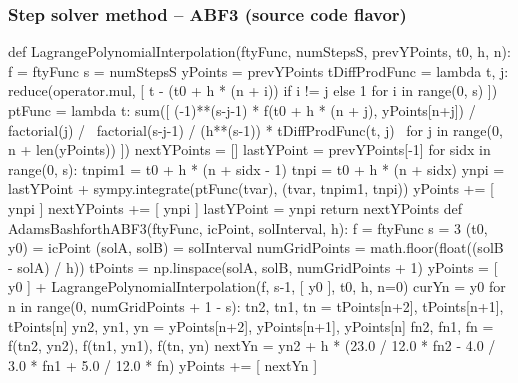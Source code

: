 \documentclass[usenames,svgnames,dvipsnames,10pt]{beamer}
\begin{document}
\begin{frame}[fragile]
\frametitle{Step solver method -- ABF3 (source code flavor)}

\begin{center}
\begin{pythoncodesmall}
def LagrangePolynomialInterpolation(ftyFunc, numStepsS, prevYPoints, t0, h, n):
    f             = ftyFunc
    s             = numStepsS 
    yPoints       = prevYPoints
    tDiffProdFunc = lambda t, j: reduce(operator.mul, [ t - (t0 + h * (n + i)) if i != j else 1 for i in range(0, s) ])
    ptFunc        = lambda t: sum([ (-1)**(s-j-1) * f(t0 + h * (n + j), yPoints[n+j]) / factorial(j) / \
                                    factorial(s-j-1) / (h**(s-1)) * tDiffProdFunc(t, j) \
                                    for j in range(0, n + len(yPoints)) ])
    nextYPoints   = []
    lastYPoint    = prevYPoints[-1]
    for sidx in range(0, s):
        tnpim1 = t0 + h * (n + sidx - 1)
        tnpi = t0 + h * (n + sidx)
        ynpi = lastYPoint + sympy.integrate(ptFunc(tvar), (tvar, tnpim1, tnpi))
        yPoints += [ ynpi ]
        nextYPoints += [ ynpi ]
        lastYPoint = ynpi
    return nextYPoints
def AdamsBashforthABF3(ftyFunc, icPoint, solInterval, h):
    f             = ftyFunc
    s             = 3
    (t0, y0)      = icPoint
    (solA, solB)  = solInterval
    numGridPoints = math.floor(float((solB - solA) / h))
    tPoints       = np.linspace(solA, solB, numGridPoints + 1)
    yPoints       = [ y0 ] + LagrangePolynomialInterpolation(f, s-1, [ y0 ], t0, h, n=0)
    curYn         = y0
    for n in range(0, numGridPoints + 1 - s):
        tn2, tn1, tn = tPoints[n+2], tPoints[n+1], tPoints[n]
        yn2, yn1, yn = yPoints[n+2], yPoints[n+1], yPoints[n]
        fn2, fn1, fn = f(tn2, yn2), f(tn1, yn1), f(tn, yn)
        nextYn = yn2 + h * (23.0 / 12.0 * fn2 - 4.0 / 3.0 * fn1 + 5.0 / 12.0 * fn)
        yPoints += [ nextYn ]
\end{pythoncodesmall}
\end{center}

\end{frame}
\end{document}
